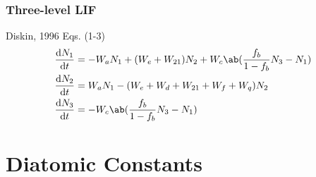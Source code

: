 \documentclass[11pt, twoside, fleqn]{report}
\begin{document}
\subsection{Three-level LIF}

Diskin, 1996 Eqs. (1-3)
\begin{align*}
    \odv{N_1}{t} & = -W_aN_1 + (W_e + W_{21})N_2 + W_c\ab(\frac{f_b}{1 - f_b}N_3 - N_1) \\
    \odv{N_2}{t} & = W_aN_1 - (W_e + W_d + W_{21} + W_f + W_q)N_2                       \\
    \odv{N_3}{t} & = -W_c\ab(\frac{f_b}{1 - f_b}N_3 - N_1)
\end{align*}

\appendix
\chapter{Diatomic Constants}
\label{a:diatomic_constants}
\end{document}
